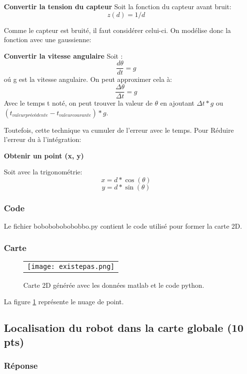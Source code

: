 \documentclass[12pt]{article}
\begin{document}
\textbf{Convertir la tension du capteur}
Soit la fonction du capteur avant bruit:
\[ z(d) = 1/d \]

Comme le capteur est bruité, il faut consid\'erer celui-ci. On mod\'elise donc la fonction avec une gaussienne:
\[ \]

\textbf{Convertir la vitesse angulaire}
Soit :
\[ \frac{d\theta}{dt} = g \] o\'u g est la vitesse angulaire.
On peut approximer cela \`a:
\[ \frac{\Delta \theta}{\Delta t}  = g\]
Avec le temps t noté, on peut trouver la valeur de $\theta$ en ajoutant $\Delta t * g $ ou $ (t_{valeur précédente} - t_{valeur courante}) * g$.

Toutefois, cette technique va cumuler de l'erreur avec le temps.
Pour Réduire l'erreur du à l'intégration:

\textbf{Obtenir un point (x, y)}

Soit avec la trigonométrie:
\[ x = d*\cos(\theta) \] \[ y = d*\sin(\theta) \]

\subsubsection{Code}
Le fichier bobobobobobobbo.py contient le code utilisé pour former la carte 2D.
\subsubsection{Carte}

\begin{figure}[ht]
 \begin{center}
  \begin{tabular}{c}
    \texttt{[image: existepas.png]}
  \end{tabular}
 \end{center}
\vspace{-0.25in}
 \caption{Carte 2D générée avec les données matlab et le code python.}
    \label{carte-2d-locale}
\end{figure}

La figure \ref{carte-2d-locale} représente le nuage de point.

\newpage
\subsection{Localisation du robot dans la carte globale (10 pts)}

\subsubsection{Réponse}
\end{document}
